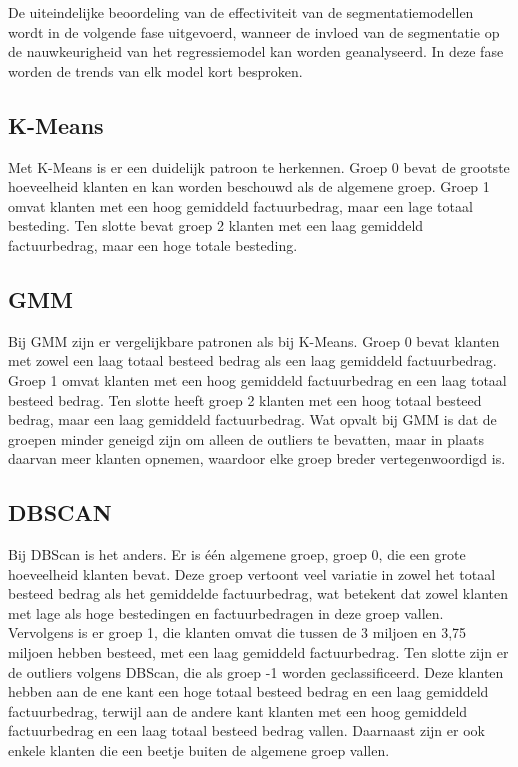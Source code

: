 De uiteindelijke beoordeling van de effectiviteit van de segmentatiemodellen wordt in de volgende fase uitgevoerd, wanneer de invloed van de segmentatie op de nauwkeurigheid van het regressiemodel kan worden geanalyseerd. In deze fase worden de trends van elk model kort besproken.

\subsection*{K-Means}

Met K-Means is er een duidelijk patroon te herkennen. Groep 0 bevat de grootste hoeveelheid klanten en kan worden beschouwd als de algemene groep. Groep 1 omvat klanten met een hoog gemiddeld factuurbedrag, maar een lage totaal besteding. Ten slotte bevat groep 2 klanten met een laag gemiddeld factuurbedrag, maar een hoge totale besteding.


\subsection*{GMM}

Bij GMM zijn er vergelijkbare patronen als bij K-Means. Groep 0 bevat klanten met zowel een laag totaal besteed bedrag als een laag gemiddeld factuurbedrag. Groep 1 omvat klanten met een hoog gemiddeld factuurbedrag en een laag totaal besteed bedrag. Ten slotte heeft groep 2 klanten met een hoog totaal besteed bedrag, maar een laag gemiddeld factuurbedrag. Wat opvalt bij GMM is dat de groepen minder geneigd zijn om alleen de outliers te bevatten, maar in plaats daarvan meer klanten opnemen, waardoor elke groep breder vertegenwoordigd is.

\subsection*{DBSCAN}

Bij DBScan is het anders. Er is één algemene groep, groep 0, die een grote hoeveelheid klanten bevat. Deze groep vertoont veel variatie in zowel het totaal besteed bedrag als het gemiddelde factuurbedrag, wat betekent dat zowel klanten met lage als hoge bestedingen en factuurbedragen in deze groep vallen. Vervolgens is er groep 1, die klanten omvat die tussen de 3 miljoen en 3,75 miljoen hebben besteed, met een laag gemiddeld factuurbedrag. Ten slotte zijn er de outliers volgens DBScan, die als groep -1 worden geclassificeerd. Deze klanten hebben aan de ene kant een hoge totaal besteed bedrag en een laag gemiddeld factuurbedrag, terwijl aan de andere kant klanten met een hoog gemiddeld factuurbedrag en een laag totaal besteed bedrag vallen. Daarnaast zijn er ook enkele klanten die een beetje buiten de algemene groep vallen.

